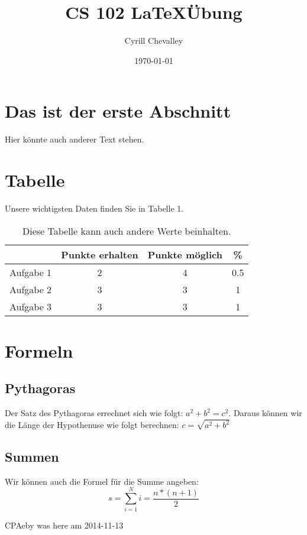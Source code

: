 \documentclass[11pt,a4paper]{article}
\title{CS 102 \LaTeX Übung}
\author{Cyrill Chevalley}
\date{\today}
\begin{document}
\maketitle

\section{Das ist der erste Abschnitt}
Hier könnte auch anderer Text stehen.

\section{Tabelle}
Unsere wichtigsten Daten finden Sie in Tabelle 1.
	\begin{table}[h]
	\begin{centering}
	\begin{tabular}{c|c|c|c}
	&Punkte erhalten&Punkte möglich& \% \\
	\hline
	Aufgabe 1&2&4&0.5 \\
	Aufgabe 2&3&3&1 \\
	Aufgabe 3&3&3&1 \\
	\end{tabular}
	\caption{Diese Tabelle kann auch andere Werte beinhalten.}
	\end{centering}
	\end{table}
	
\section{Formeln}
\subsection{Pythagoras}
Der Satz des Pythagoras errechnet sich wie folgt: $a^{2} + b^2 = c^2$.
Daraus können wir die Länge der Hypothenuse wie folgt berechnen: 
$c = \sqrt{a^2 + b^2} $

\subsection{Summen}	
Wir können auch die Formel für die Summe angeben:
\begin{equation}
s=\sum \limits_{i=1}^{N} i = \frac{n \ast (n+1)}{2}
\end{equation}

CPAeby was here am 2014-11-13
\end{document}
